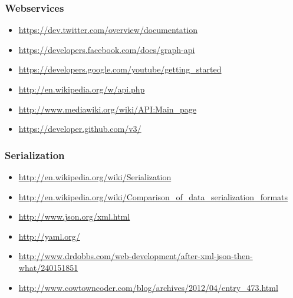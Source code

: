 \subsubsection*{Webservices} 
\begin{itemize}
\item \url{https://dev.twitter.com/overview/documentation}
\item \url{https://developers.facebook.com/docs/graph-api}
\item \url{https://developers.google.com/youtube/getting_started}
\item \url{http://en.wikipedia.org/w/api.php}
\item \url{http://www.mediawiki.org/wiki/API:Main_page}
\item \url{https://developer.github.com/v3/}
\end{itemize}

\subsubsection*{Serialization}

\begin{itemize}
\item \url{http://en.wikipedia.org/wiki/Serialization}
\item \url{http://en.wikipedia.org/wiki/Comparison_of_data_serialization_formats}
\item \url{http://www.json.org/xml.html}
\item \url{http://yaml.org/}
\item \url{http://www.drdobbs.com/web-development/after-xml-json-then-what/240151851}
\item \url{http://www.cowtowncoder.com/blog/archives/2012/04/entry_473.html}
\end{itemize}



